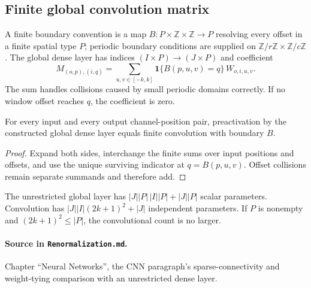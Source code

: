 \subsection{Finite global convolution matrix}

\begin{definition}
\label{def:renorm:globalConvolution}
A finite boundary convention is a map
$B:P\times\mathbb Z\times\mathbb Z\to P$ resolving every offset in a finite spatial type $P$;
periodic boundary conditions are supplied on
$\mathbb Z/r\mathbb Z\times\mathbb Z/c\mathbb Z$.  The global dense layer has indices
$(I\times P)\to(J\times P)$ and coefficient
\[
 M_{(o,p),(i,q)}=
 \sum_{u,v\in[-k,k]}\mathbf 1\{B(p,u,v)=q\}\,W_{o,i,u,v}.
\]
The sum handles collisions caused by small periodic domains correctly.  If no window offset reaches
$q$, the coefficient is zero.
\end{definition}

\begin{theorem}
\label{thm:renorm:globalConvolutionCorrect}
For every input and every output channel-position pair, preactivation by the constructed global
dense layer equals finite convolution with boundary $B$.

\begin{proof}
Expand both sides, interchange the finite sums over input positions and offsets, and use the unique
surviving indicator at $q=B(p,u,v)$.  Offset collisions remain separate summands and therefore add.
\end{proof}
\end{theorem}

\begin{theorem}
\label{thm:renorm:convParamComparison}
The unrestricted global layer has
$|J||P|\,|I||P|+|J||P|$ scalar parameters.  Convolution has
$|J||I|(2k+1)^2+|J|$ independent parameters.  If $P$ is nonempty and
$(2k+1)^2\le |P|$, the convolutional count is no larger.

\paragraph{Source in \texttt{Renormalization.md}.}
Chapter ``Neural Networks'', the CNN paragraph's sparse-connectivity and weight-tying comparison
with an unrestricted dense layer.
\end{theorem}

